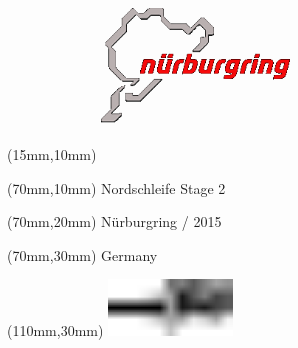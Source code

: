 \null\newpage
\begin{textblock*}{50mm}(15mm,10mm)%
\includegraphics[width=50mm]{LG/NUR.png}
\end{textblock*}
\begin{textblock*}{130mm}(70mm,10mm)%
{\fontsize{20}{20}\selectfont Nordschleife Stage 2}\\
\end{textblock*}
\begin{textblock*}{120mm}(70mm,20mm)%
{\fontsize{16}{16}\selectfont Nürburgring / 2015}\\
\end{textblock*}
\begin{textblock*}{120mm}(70mm,30mm)%
{\fontsize{12}{12}\selectfont Germany}
\end{textblock*}
\begin{textblock*}{30mm}(110mm,30mm)%
\centering
\includegraphics[height=15mm]{icons/tofinish.pdf}
\end{textblock*}

